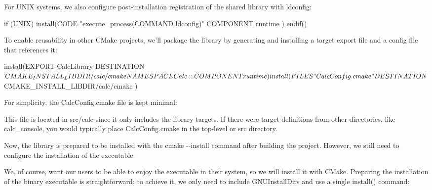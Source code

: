 For UNIX systems, we also configure post-installation registration of the shared library with ldconfig:


\begin{cmake}
if (UNIX)
    install(CODE "execute_process(COMMAND ldconfig)"
        COMPONENT runtime
    )
endif()
\end{cmake}

To enable reusability in other CMake projects, we’ll package the library by generating and installing a target export file and a config file that references it:


\begin{cmake}
install(EXPORT CalcLibrary
    DESTINATION ${CMAKE_INSTALL_LIBDIR}/calc/cmake
    NAMESPACE Calc::
    COMPONENT runtime
)

install(FILES "CalcConfig.cmake"
    DESTINATION ${CMAKE_INSTALL_LIBDIR}/calc/cmake
)
\end{cmake}

For simplicity, the CalcConfig.cmake file is kept minimal:



This file is located in src/calc since it only includes the library targets. If there were target definitions from other directories, like calc\_console, you would typically place CalcConfig.cmake in the top-level or src directory.

Now, the library is prepared to be installed with the cmake -{}-install command after building the project. However, we still need to configure the installation of the executable.


We, of course, want our users to be able to enjoy the executable in their system, so we will install it with CMake. Preparing the installation of the binary executable is straightforward; to achieve it, we only need to include GNUInstallDirs and use a single install() command:


